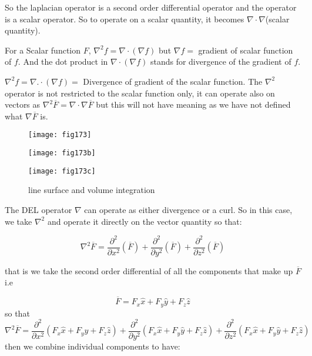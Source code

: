 So the laplacian operator is a second order differential operator and the operator is a scalar operator. So to operate on a scalar quantity, it becomes $\nabla\cdot\nabla$(scalar quantity).\newline

For a Scalar function $F$, $\nabla^2f = \nabla \cdot (\nabla f)$ but $\nabla f =$ gradient of scalar function of $f$. And the dot product in $\nabla \cdot (\nabla f) $ stands for divergence of the gradient of $f$.
\newline

$\nabla^2 f= \nabla .\cdot (\nabla f) =$ Divergence of gradient of the scalar function. The $\nabla^2 $ operator is not restricted to the scalar function only, it can operate also on vectors as $\nabla^2 \overline{F} = \nabla \cdot \nabla \overline{F}$ but this will not have meaning as we have not defined what $\nabla \overline{F}$ is.\newline
\begin{figure}[htbp]
	\centering
	\begin{minipage}{.25\textwidth}
	\centering
	\texttt{[image: fig173]}
	\label{}
	\end{minipage}%
	\begin{minipage}{.25\textwidth}
	\centering
	\texttt{[image: fig173b]}
	\label{}
	\end{minipage}
	\begin{minipage}{.5\textwidth}
	\centering
	\texttt{[image: fig173c]}
	\label{}
\end{minipage}%
\caption{line surface and volume integration}
\end{figure}

The DEL operator $\nabla$ can operate as either divergence or a curl. So in this case, we take $\nabla^2$ and operate it directly on the vector quantity so that:

\begin{equation}
\nabla^{2} \overline{F} = \frac{\partial ^ {2}}{\partial x^{2}}(\overline{F}) + \frac{\partial ^ {2}}{\partial y^{2}}(\overline{F}) + \frac{\partial ^ {2}}{\partial z^{2}}(\overline{F})
\end{equation}

that is we take the second order differential of all the components that make up $\overline{F}$ i.e

\begin{equation*}
\overline{F} = F_{x}\hat x + F_{y}\hat y + F_{z}\hat z
\end{equation*}
 so that
	\begin{dmath}
	\nabla^{2} \overline{F} = \frac{\partial ^ {2}}{\partial x^{2}}(F_{x}\hat x + F_{y}\hat y + F_{z}\hat z) + \frac{\partial ^ {2}}{\partial y^{2}}(F_{x}\hat x + F_{y}\hat y + F_{z}\hat z) + 
	\frac{\partial ^ {2}}{\partial z^{2}}(F_{x}\hat x + F_{y}\hat y + F_{z}\hat z)
	\end{dmath}
then we combine individual components to have:

